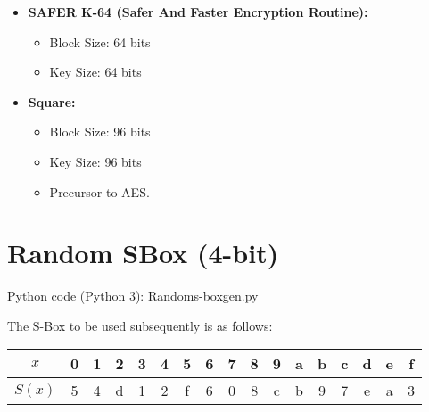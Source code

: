 \documentclass[12pt]{article}
\begin{document}
\begin{large}
\begin{itemize}[itemsep=-1ex, topsep=-1ex]
\item \textbf{SAFER K-64 (Safer And Faster Encryption Routine):}
	\begin{itemize}[itemsep=-2ex, topsep=-2ex]
	\item Block Size: 64 bits
	\item Key Size: 64 bits
	\end{itemize}
	
\item \textbf{Square:}
	\begin{itemize}[itemsep=-2ex, topsep=-2ex]
	\item Block Size: 96 bits
	\item Key Size: 96 bits
	\item Precursor to AES.
	\end{itemize}
	
\end{itemize}

\end{large}

\section{Random SBox (4-bit)}
\begin{large}
Python code (Python 3): Random\textunderscore s-box\textunderscore gen.py


The S-Box to be used subsequently is as follows:
\begin{center}

\begin{tabular}{|c|c|c|c|c|c|c|c|c|c|c|c|c|c|c|c|c|}
\hline
$x$ & 0 & 1 & 2 & 3 & 4 & 5 & 6 & 7 & 8 & 9 & a & b & c & d & e & f\\\hline
$S(x)$ & 5 & 4 & d & 1 & 2 & f & 6 & 0 & 8 & c & b & 9 & 7 & e & a & 3\\\hline
\end{tabular}

\end{center}
\end{large}
\vspace{0.5cm}
\end{document}
